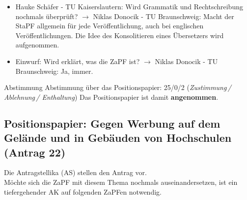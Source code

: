     \begin{itemize}
      \item Hauke Schäfer - TU Kaiserslautern:  Wird Grammatik und Rechtschreibung nochmals überprüft?
        $\rightarrow$ Niklas Donocik - TU Braunschweig:  Macht der StaPF allgemein für jede Veröffentlichung, auch bei englischen Veröffentlichungen. Die Idee des Konsolitieren eines Übersetzers wird aufgenommen.
      \item Einwurf: Wird erklärt, was die ZaPF ist?
        $\rightarrow$ Niklas Donocik - TU Braunschweig:  Ja, immer.
    \end{itemize}

    \begin{success}{Abstimmung}
      Abstimmung über das Positionspapier: 25/0/2 (\textit{Zustimmung\,/ Ablehnung\,/ Enthaltung})
      Das Positionspapier ist damit \textbf{angenommen}.
    \end{success}

  \subsection*{Positionspapier: Gegen Werbung auf dem Gelände und in Gebäuden von Hochschulen (Antrag 22)}
    Die Antragstellika (AS) stellen den Antrag vor. \\
    Möchte sich die ZaPF mit diesem Thema nochmals auseinandersetzen, ist ein tiefergehender AK auf folgenden ZaPFen notwendig.

